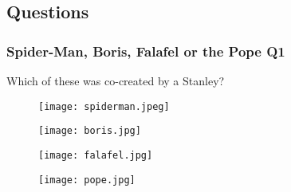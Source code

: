 \documentclass{beamer}
\begin{document}
\subsection{Questions}
\begin{frame}
\frametitle{Spider-Man, Boris, Falafel or the Pope Q1}
Which of these was co-created by a Stanley?
\begin{figure}[!htb]
    \centering
    \begin{minipage}{.5\textwidth}
        \centering
        \texttt{[image: spiderman.jpeg]}
        
    \end{minipage}%
    \begin{minipage}{0.5\textwidth}
        \centering
        \texttt{[image: boris.jpg]}
        
    \end{minipage}
\end{figure}
\begin{figure}[!htb]
    \centering
    \begin{minipage}{.5\textwidth}
        \centering
        \texttt{[image: falafel.jpg]}
        
    \end{minipage}%
    \begin{minipage}{0.5\textwidth}
        \centering
        \texttt{[image: pope.jpg]}
        
    \end{minipage}
\end{figure}
\end{frame}
\end{document}
